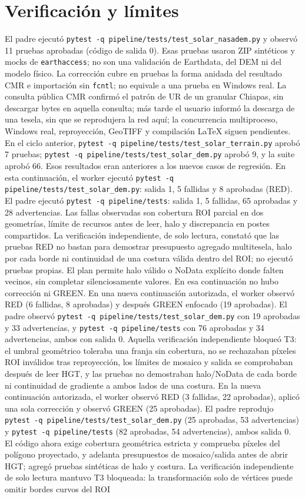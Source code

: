 \documentclass[11pt,a4paper]{article}
\begin{document}
\section{Verificación y límites}
El padre ejecutó \texttt{pytest -q pipeline/tests/test\_solar\_nasadem.py} y observó 11 pruebas aprobadas (código de salida 0). Esas pruebas usaron ZIP sintéticos y mocks de \texttt{earthaccess}; no son una validación de Earthdata, del DEM ni del modelo físico. La corrección cubre en pruebas la forma anidada del resultado CMR e importación sin \texttt{fcntl}; no equivale a una prueba en Windows real. La consulta pública CMR confirmó el patrón de UR de un granular Chiapas, sin descargar bytes en aquella consulta; más tarde el usuario informó la descarga de una tesela, sin que se reprodujera la red aquí; la concurrencia multiproceso, Windows real, reproyección, GeoTIFF y compilación LaTeX siguen pendientes. En el ciclo anterior, \texttt{pytest -q pipeline/tests/test\_solar\_terrain.py} aprobó 7 pruebas; \texttt{pytest -q pipeline/tests/test\_solar\_dem.py} aprobó 9, y la suite aprobó 66. Esos resultados eran anteriores a los nuevos casos de regresión. En esta continuación, el worker ejecutó \texttt{pytest -q pipeline/tests/test\_solar\_dem.py}: salida 1, 5 fallidas y 8 aprobadas (RED). El padre ejecutó \texttt{pytest -q pipeline/tests}: salida 1, 5 fallidas, 65 aprobadas y 28 advertencias. Las fallas observadas son cobertura ROI parcial en dos geometrías, límite de recursos antes de leer, halo y discrepancia en postes compartidos. La verificación independiente, de solo lectura, constató que las pruebas RED no bastan para demostrar presupuesto agregado multitesela, halo por cada borde ni continuidad de una costura válida dentro del ROI; no ejecutó pruebas propias. El plan permite halo válido o NoData explícito donde falten vecinos, sin completar silenciosamente valores. En esa continuación no hubo corrección ni GREEN. En una nueva continuación autorizada, el worker observó RED (6 fallidas, 8 aprobadas) y después GREEN enfocado (19 aprobadas). El padre observó \texttt{pytest -q pipeline/tests/test\_solar\_dem.py} con 19 aprobadas y 33 advertencias, y \texttt{pytest -q pipeline/tests} con 76 aprobadas y 34 advertencias, ambos con salida 0. Aquella verificación independiente bloqueó T3: el umbral geométrico toleraba una franja sin cobertura, no se rechazaban píxeles ROI inválidos tras reproyección, los límites de mosaico y salida se comprobaban después de leer HGT, y las pruebas no demostraban halo/NoData de cada borde ni continuidad de gradiente a ambos lados de una costura. En la nueva continuación autorizada, el worker observó RED (3 fallidas, 22 aprobadas), aplicó una sola corrección y observó GREEN (25 aprobadas). El padre reprodujo \texttt{pytest -q pipeline/tests/test\_solar\_dem.py} (25 aprobadas, 53 advertencias) y \texttt{pytest -q pipeline/tests} (82 aprobadas, 54 advertencias), ambos salida 0. El código ahora exige cobertura geométrica estricta y comprueba píxeles del polígono proyectado, y adelanta presupuestos de mosaico/salida antes de abrir HGT; agregó pruebas sintéticas de halo y costura. La verificación independiente de solo lectura mantuvo T3 bloqueada: la transformación solo de vértices puede omitir bordes curvos del ROI 
\end{document}
